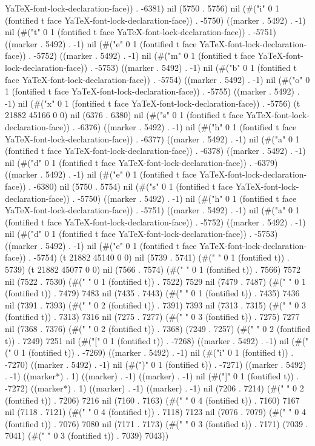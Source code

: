 YaTeX-font-lock-declaration-face)) . -6381) nil (5750 . 5756) nil (#("i" 0 1 (fontified t face YaTeX-font-lock-declaration-face)) . -5750) ((marker . 5492) . -1) nil (#("t" 0 1 (fontified t face YaTeX-font-lock-declaration-face)) . -5751) ((marker . 5492) . -1) nil (#("e" 0 1 (fontified t face YaTeX-font-lock-declaration-face)) . -5752) ((marker . 5492) . -1) nil (#("m" 0 1 (fontified t face YaTeX-font-lock-declaration-face)) . -5753) ((marker . 5492) . -1) nil (#("b" 0 1 (fontified t face YaTeX-font-lock-declaration-face)) . -5754) ((marker . 5492) . -1) nil (#("o" 0 1 (fontified t face YaTeX-font-lock-declaration-face)) . -5755) ((marker . 5492) . -1) nil (#("x" 0 1 (fontified t face YaTeX-font-lock-declaration-face)) . -5756) (t 21882 45166 0 0) nil (6376 . 6380) nil (#("s" 0 1 (fontified t face YaTeX-font-lock-declaration-face)) . -6376) ((marker . 5492) . -1) nil (#("h" 0 1 (fontified t face YaTeX-font-lock-declaration-face)) . -6377) ((marker . 5492) . -1) nil (#("a" 0 1 (fontified t face YaTeX-font-lock-declaration-face)) . -6378) ((marker . 5492) . -1) nil (#("d" 0 1 (fontified t face YaTeX-font-lock-declaration-face)) . -6379) ((marker . 5492) . -1) nil (#("e" 0 1 (fontified t face YaTeX-font-lock-declaration-face)) . -6380) nil (5750 . 5754) nil (#("s" 0 1 (fontified t face YaTeX-font-lock-declaration-face)) . -5750) ((marker . 5492) . -1) nil (#("h" 0 1 (fontified t face YaTeX-font-lock-declaration-face)) . -5751) ((marker . 5492) . -1) nil (#("a" 0 1 (fontified t face YaTeX-font-lock-declaration-face)) . -5752) ((marker . 5492) . -1) nil (#("d" 0 1 (fontified t face YaTeX-font-lock-declaration-face)) . -5753) ((marker . 5492) . -1) nil (#("e" 0 1 (fontified t face YaTeX-font-lock-declaration-face)) . -5754) (t 21882 45140 0 0) nil (5739 . 5741) (#(" " 0 1 (fontified t)) . 5739) (t 21882 45077 0 0) nil (7566 . 7574) (#("	" 0 1 (fontified t)) . 7566) 7572 nil (7522 . 7530) (#("	" 0 1 (fontified t)) . 7522) 7529 nil (7479 . 7487) (#("	" 0 1 (fontified t)) . 7479) 7483 nil (7435 . 7443) (#("	" 0 1 (fontified t)) . 7435) 7436 nil (7391 . 7393) (#("  " 0 2 (fontified t)) . 7391) 7393 nil (7313 . 7315) (#("	  " 0 3 (fontified t)) . 7313) 7316 nil (7275 . 7277) (#("	  " 0 3 (fontified t)) . 7275) 7277 nil (7368 . 7376) (#("	 " 0 2 (fontified t)) . 7368) (7249 . 7257) (#("	 " 0 2 (fontified t)) . 7249) 7251 nil (#("[" 0 1 (fontified t)) . -7268) ((marker . 5492) . -1) nil (#("(" 0 1 (fontified t)) . -7269) ((marker . 5492) . -1) nil (#("i" 0 1 (fontified t)) . -7270) ((marker . 5492) . -1) nil (#(")" 0 1 (fontified t)) . -7271) ((marker . 5492) . -1) ((marker*) . 1) ((marker) . -1) ((marker) . -1) nil (#("]" 0 1 (fontified t)) . -7272) ((marker*) . 1) ((marker) . -1) ((marker) . -1) nil (7206 . 7214) (#("	 " 0 2 (fontified t)) . 7206) 7216 nil (7160 . 7163) (#("	   " 0 4 (fontified t)) . 7160) 7167 nil (7118 . 7121) (#("	   " 0 4 (fontified t)) . 7118) 7123 nil (7076 . 7079) (#("	   " 0 4 (fontified t)) . 7076) 7080 nil (7171 . 7173) (#("	  " 0 3 (fontified t)) . 7171) (7039 . 7041) (#("	  " 0 3 (fontified t)) . 7039) 7043))
